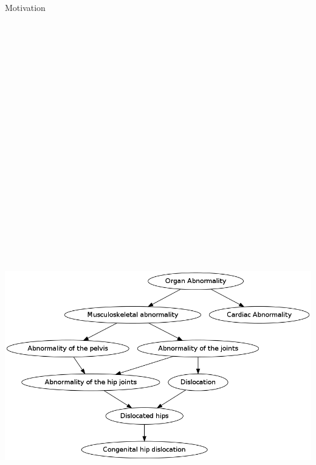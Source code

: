 \documentclass[final]{beamer} %
\begin{document}
\begin{frame}{}
\begin{columns}[T]
\begin{column}{0.3\linewidth}
    \begin{block}{\Huge Motivation}
    \begin{columns}[T]
      \begin{column}{.5\textwidth}
   \centering
  \includegraphics[width = \textwidth, height=40cm ]{hpo}
      \end{column}
      

\end{columns}
\end{block}
\end{column}
\end{columns}
\end{frame}
\end{document}
